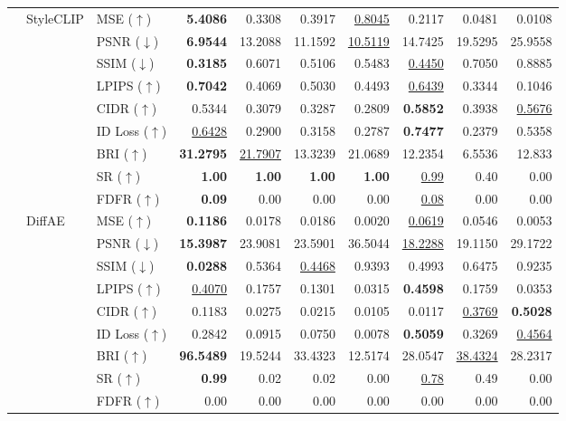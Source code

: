 \documentclass{article}
\begin{document}
\begin{table}[h!]
\begin{tabular}{lllrrrrrrr}
& \multirow{9}{*}{StyleCLIP}
& MSE ($\uparrow$) & \textbf{5.4086} & 0.3308 & 0.3917 & \underline{0.8045} & 0.2117 & 0.0481 & 0.0108 \\
& & PSNR ($\downarrow$) & \textbf{6.9544} & 13.2088 & 11.1592 & \underline{10.5119} & 14.7425 & 19.5295 & 25.9558 \\
& & SSIM ($\downarrow$) & \textbf{0.3185} & 0.6071 & 0.5106 & 0.5483 & \underline{0.4450} & 0.7050 & 0.8885 \\
& & LPIPS ($\uparrow$) & \textbf{0.7042} & 0.4069 & 0.5030 & 0.4493 & \underline{0.6439} & 0.3344 & 0.1046 \\
& & CIDR ($\uparrow$) & 0.5344 & 0.3079 & 0.3287 & 0.2809 & \textbf{0.5852} & 0.3938 & \underline{0.5676} \\
& & ID Loss ($\uparrow$) & \underline{0.6428} & 0.2900 & 0.3158 & 0.2787 & \textbf{0.7477} & 0.2379 & 0.5358 \\
& & BRI ($\uparrow$) & \textbf{31.2795} & \underline{21.7907} & 13.3239 & 21.0689 & 12.2354 & 6.5536 & 12.833 \\
& & SR ($\uparrow$) & \textbf{1.00} & \textbf{1.00} & \textbf{1.00} & \textbf{1.00} & \underline{0.99} & 0.40 & 0.00 \\
& & FDFR ($\uparrow$) & \textbf{0.09} & 0.00 & 0.00 & 0.00 & \underline{0.08} & 0.00 & 0.00 \\
\cmidrule(lr){2-10}

& \multirow{9}{*}{DiffAE}
& MSE ($\uparrow$) & \textbf{0.1186} & 0.0178 & 0.0186 & 0.0020 & \underline{0.0619} & 0.0546 & 0.0053 \\
& & PSNR ($\downarrow$) & \textbf{15.3987} & 23.9081 & 23.5901 & 36.5044 & \underline{18.2288} & 19.1150 & 29.1722 \\
& & SSIM ($\downarrow$) & \textbf{0.0288} & 0.5364 & \underline{0.4468} & 0.9393 & 0.4993 & 0.6475 & 0.9235 \\
& & LPIPS ($\uparrow$) & \underline{0.4070} & 0.1757 & 0.1301 & 0.0315 & \textbf{0.4598} & 0.1759 & 0.0353 \\
& & CIDR ($\uparrow$) & 0.1183 & 0.0275 & 0.0215 & 0.0105 & 0.0117 & \underline{0.3769} & \textbf{0.5028} \\
& & ID Loss ($\uparrow$) & 0.2842 & 0.0915 & 0.0750 & 0.0078 & \textbf{0.5059} & 0.3269 & \underline{0.4564} \\
& & BRI ($\uparrow$) & \textbf{96.5489} & 19.5244 & 33.4323 & 12.5174 & 28.0547 & \underline{38.4324} & 28.2317 \\
& & SR ($\uparrow$) & \textbf{0.99} & 0.02 & 0.02 & 0.00 & \underline{0.78} & 0.49 & 0.00 \\
& & FDFR ($\uparrow$) & 0.00 & 0.00 & 0.00 & 0.00 & 0.00 & 0.00 & 0.00 \\
\midrule


\end{tabular}
\end{table}
\end{document}
